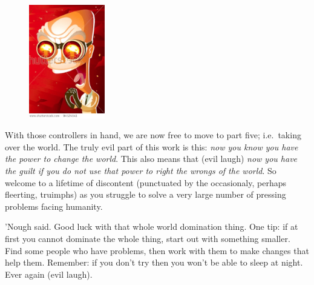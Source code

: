 \begin{figure}
\includegraphics[width=1.3in]{img/evillaugh.jpg}
\end{figure}

With those controllers in hand, we are now free to move to part five;
i.e.~taking over the world. The truly evil part of this work is this:
\emph{now you know you have the power to change the world}. This also
means that (evil laugh) \emph{now you have the guilt if you do not use
that power to right the wrongs of the world}. So welcome to a lifetime
of discontent (punctuated by the occasionaly, perhaps fleerting,
truimphs) as you struggle to solve a very large number of pressing
problems facing humanity.

'Nough said. Good luck with that whole world domination thing. One tip:
if at first you cannot dominate the whole thing, start out with
something smaller. Find some people who have problems, then work with
them to make changes that help them. Remember: if you don't try then you
won't be able to sleep at night. Ever again (evil laugh).
